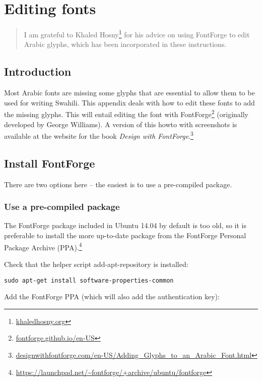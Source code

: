 \chapter{Editing fonts}
\renewcommand{\thesection}{B/\arabic{section}}  %
\setcounter{section}{0}  %
\label{appB}

\begin{quotation}
\noindent I am grateful to Khaled Hosny\footnote{\url{khaledhosny.org}} for his advice on using FontForge to edit Arabic glyphs, which has been incorporated in these instructions.
\end{quotation}

\section{Introduction}
\label{appb:intro}

Most Arabic fonts are missing some glyphs that are essential to allow them to be used for writing Swahili.  This appendix deals with how to edit these fonts to add the missing glyphs.  This will entail editing the font with FontForge\footnote{\url{fontforge.github.io/en-US}} (originally developed by George Williams).  A version of this howto with screenshots is available at the website for the book \textit{Design with FontForge}.\footnote{\url{designwithfontforge.com/en-US/Adding_Glyphs_to_an_Arabic_Font.html}}


\section{Install FontForge}

There are two options here -- the easiest is to use a pre-compiled package.

\subsection{Use a pre-compiled package}

The FontForge package included in Ubuntu 14.04 by default is too old, so it is preferable to install the more up-to-date package from the FontForge Personal Package Archive (PPA).\footnote{\url{https://launchpad.net/~fontforge/+archive/ubuntu/fontforge}}

Check that the helper script add-apt-repository is installed:

\verb|sudo apt-get install software-properties-common|

Add the FontForge PPA (which will also add the authentication key):

